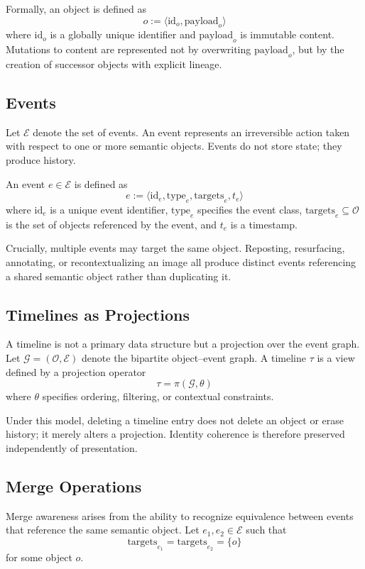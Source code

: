 \documentclass[11pt,oneside]{article}
\begin{document}
Formally, an object is defined as
\[
o := \langle \mathrm{id}_o, \mathrm{payload}_o \rangle
\]
where $\mathrm{id}_o$ is a globally unique identifier and $\mathrm{payload}_o$ is immutable content. Mutations to content are represented not by overwriting $\mathrm{payload}_o$, but by the creation of successor objects with explicit lineage.

\subsection{Events}

Let $\mathcal{E}$ denote the set of events. An event represents an irreversible action taken with respect to one or more semantic objects. Events do not store state; they produce history.

An event $e \in \mathcal{E}$ is defined as
\[
e := \langle \mathrm{id}_e, \mathrm{type}_e, \mathrm{targets}_e, t_e \rangle
\]
where $\mathrm{id}_e$ is a unique event identifier, $\mathrm{type}_e$ specifies the event class, $\mathrm{targets}_e \subseteq \mathcal{O}$ is the set of objects referenced by the event, and $t_e$ is a timestamp.

Crucially, multiple events may target the same object. Reposting, resurfacing, annotating, or recontextualizing an image all produce distinct events referencing a shared semantic object rather than duplicating it.

\subsection{Timelines as Projections}

A timeline is not a primary data structure but a projection over the event graph. Let $\mathcal{G} = (\mathcal{O}, \mathcal{E})$ denote the bipartite object–event graph. A timeline $\tau$ is a view defined by a projection operator
\[
\tau = \pi(\mathcal{G}, \theta)
\]
where $\theta$ specifies ordering, filtering, or contextual constraints.

Under this model, deleting a timeline entry does not delete an object or erase history; it merely alters a projection. Identity coherence is therefore preserved independently of presentation.

\subsection{Merge Operations}

Merge awareness arises from the ability to recognize equivalence between events that reference the same semantic object. Let $e_1, e_2 \in \mathcal{E}$ such that
\[
\mathrm{targets}_{e_1} = \mathrm{targets}_{e_2} = \{o\}
\]
for some object $o$.
\end{document}
